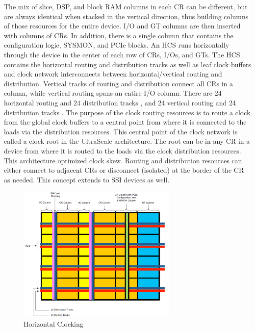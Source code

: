 \documentclass[12pt, a4paper]{report}
\begin{document}
    The mix of slice, DSP, and block RAM columns in each CR can be different, but are always identical when stacked in the vertical direction, thus building columns of those
    resources for the entire device. I/O and GT columns are then inserted with columns of CRs.
    In addition, there is a single column that contains the configuration logic, SYSMON, and PCIe blocks. An HCS runs horizontally through the device in the center of each row of CRs,
    I/Os, and GTs. The HCS contains the horizontal routing and distribution tracks as well as leaf
    clock buffers and clock network interconnects between horizontal/vertical routing and
    distribution. Vertical tracks of routing and distribution connect all CRs in a column, while
    vertical routing spans an entire I/O column. There are 24 horizontal routing and 24
    distribution tracks , and 24 vertical routing and 24 distribution tracks . The purpose of the clock routing resources is to route a clock from the global
    clock buffers to a central point from where it is connected to the loads via the distribution
    resources. This central point of the clock network is called a clock root in the UltraScale
    architecture. The root can be in any CR in a device from where it is routed to the loads via
    the clock distribution resources. This architecture optimized clock skew. Routing and
    distribution resources can either connect to adjacent CRs or disconnect (isolated) at the
    border of the CR as needed. This concept extends to SSI devices as well.
    
    \begin{figure}[H]
        \begin{center}
            \includegraphics[width=0.7\textwidth]{images/HorizClock.png}
            \caption{Horizontal Clocking}
            \label{HorizClock}
        \end{center}
    \end{figure}
\end{document}
